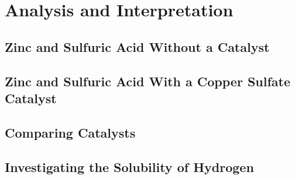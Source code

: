 \chapter {Analysis and Interpretation}

\section{Zinc and Sulfuric Acid Without a Catalyst}

\section{Zinc and Sulfuric Acid With a Copper Sulfate Catalyst}

\section{Comparing Catalysts}

\section{Investigating the Solubility of Hydrogen}